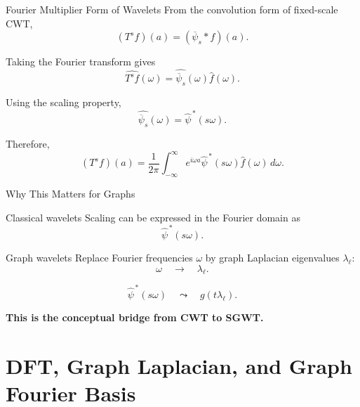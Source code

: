\documentclass[aspectratio=1610,xcolor=dvipsnames,t]{beamer}
\newcommand{\keyterm}[1]{\textcolor{unirot}{\textbf{#1}}}
\begin{document}
\begin{frame}{Fourier Multiplier Form of Wavelets}
From the convolution form of fixed-scale CWT,
\[
(T^s f)(a)
=
(\overline{\psi}_s*f)(a).
\]

Taking the Fourier transform gives
\[
\widehat{T^s f}(\omega)
=
\widehat{\overline{\psi}_s}(\omega)\widehat f(\omega).
\tag{SGWT Eq. 7}
\]

Using the scaling property,
\[
\widehat{\overline{\psi}_s}(\omega)
=
\widehat\psi^{\,*}(s\omega).
\tag{SGWT Eq. 8}
\]

Therefore,
\[
(T^s f)(a)
=
\frac{1}{2\pi}
\int_{-\infty}^{\infty}
e^{i\omega a}
\widehat\psi^{\,*}(s\omega)
\widehat f(\omega)\,d\omega.
\tag{SGWT Eq. 9}
\]
\end{frame}


\begin{frame}{Why This Matters for Graphs}
\begin{block}{Classical wavelets}
Scaling can be expressed in the Fourier domain as
\[
\widehat\psi^{\,*}(s\omega).
\]
\end{block}

\begin{block}{Graph wavelets}
Replace Fourier frequencies $\omega$ by graph Laplacian eigenvalues $\lambda_\ell$:
\[
\omega
\quad\longrightarrow\quad
\lambda_\ell.
\]
\end{block}

\[
\widehat\psi^{\,*}(s\omega)
\quad\leadsto\quad
g(t\lambda_\ell).
\]

\begin{center}
\keyterm{This is the conceptual bridge from CWT to SGWT.}
\end{center}
\end{frame}

\section[DFT and Graph Fourier]{DFT, Graph Laplacian, and Graph Fourier Basis}
\end{document}
